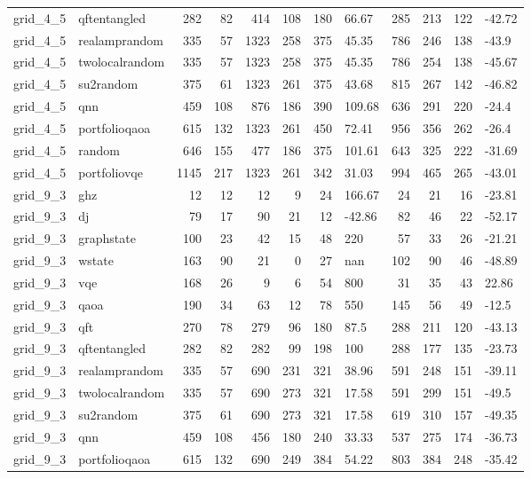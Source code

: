 \begin{longtable}{llrrrrrlrrrl}
grid\_4\_5 & qftentangled & 282 & 82 & 414 & 108 & 180 & 66.67 & 285 & 213 & 122 & -42.72 \\
grid\_4\_5 & realamprandom & 335 & 57 & 1323 & 258 & 375 & 45.35 & 786 & 246 & 138 & -43.9 \\
grid\_4\_5 & twolocalrandom & 335 & 57 & 1323 & 258 & 375 & 45.35 & 786 & 254 & 138 & -45.67 \\
grid\_4\_5 & su2random & 375 & 61 & 1323 & 261 & 375 & 43.68 & 815 & 267 & 142 & -46.82 \\
grid\_4\_5 & qnn & 459 & 108 & 876 & 186 & 390 & 109.68 & 636 & 291 & 220 & -24.4 \\
grid\_4\_5 & portfolioqaoa & 615 & 132 & 1323 & 261 & 450 & 72.41 & 956 & 356 & 262 & -26.4 \\
grid\_4\_5 & random & 646 & 155 & 477 & 186 & 375 & 101.61 & 643 & 325 & 222 & -31.69 \\
grid\_4\_5 & portfoliovqe & 1145 & 217 & 1323 & 261 & 342 & 31.03 & 994 & 465 & 265 & -43.01 \\
grid\_9\_3 & ghz & 12 & 12 & 12 & 9 & 24 & 166.67 & 24 & 21 & 16 & -23.81 \\
grid\_9\_3 & dj & 79 & 17 & 90 & 21 & 12 & -42.86 & 82 & 46 & 22 & -52.17 \\
grid\_9\_3 & graphstate & 100 & 23 & 42 & 15 & 48 & 220 & 57 & 33 & 26 & -21.21 \\
grid\_9\_3 & wstate & 163 & 90 & 21 & 0 & 27 & nan & 102 & 90 & 46 & -48.89 \\
grid\_9\_3 & vqe & 168 & 26 & 9 & 6 & 54 & 800 & 31 & 35 & 43 & 22.86 \\
grid\_9\_3 & qaoa & 190 & 34 & 63 & 12 & 78 & 550 & 145 & 56 & 49 & -12.5 \\
grid\_9\_3 & qft & 270 & 78 & 279 & 96 & 180 & 87.5 & 288 & 211 & 120 & -43.13 \\
grid\_9\_3 & qftentangled & 282 & 82 & 282 & 99 & 198 & 100 & 288 & 177 & 135 & -23.73 \\
grid\_9\_3 & realamprandom & 335 & 57 & 690 & 231 & 321 & 38.96 & 591 & 248 & 151 & -39.11 \\
grid\_9\_3 & twolocalrandom & 335 & 57 & 690 & 273 & 321 & 17.58 & 591 & 299 & 151 & -49.5 \\
grid\_9\_3 & su2random & 375 & 61 & 690 & 273 & 321 & 17.58 & 619 & 310 & 157 & -49.35 \\
grid\_9\_3 & qnn & 459 & 108 & 456 & 180 & 240 & 33.33 & 537 & 275 & 174 & -36.73 \\
grid\_9\_3 & portfolioqaoa & 615 & 132 & 690 & 249 & 384 & 54.22 & 803 & 384 & 248 & -35.42 \\

\end{longtable}

